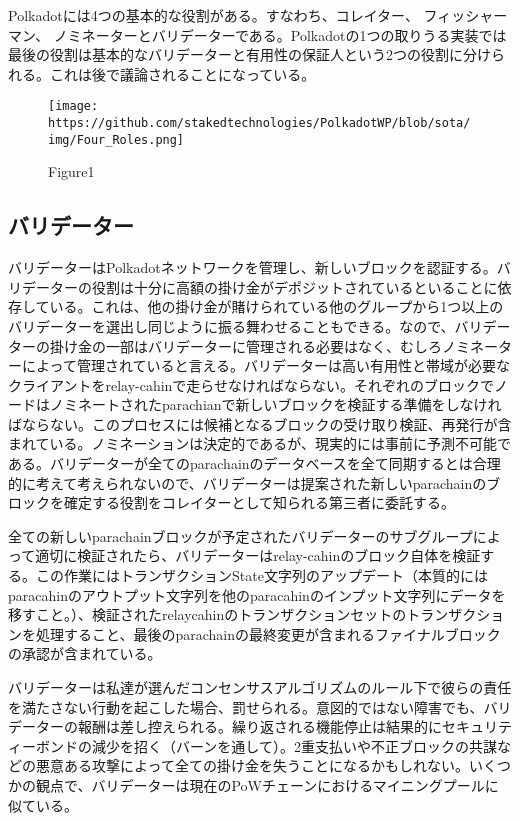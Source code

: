 Polkadotには4つの基本的な役割がある。すなわち、コレイター、
フィッシャーマン、
ノミネーターとバリデーターである。Polkadotの1つの取りうる実装では最後の役割は基本的なバリデーターと有用性の保証人という2つの役割に分けられる。これは後で議論されることになっている。

\begin{figure}
\centering
\texttt{[image: https://github.com/stakedtechnologies/PolkadotWP/blob/sota/img/Four\_Roles.png]}
\caption{Figure1}
\end{figure}

\hypertarget{ux30d0ux30eaux30c7ux30fcux30bfux30fc}{%
\subsection{バリデーター}\label{ux30d0ux30eaux30c7ux30fcux30bfux30fc}}

バリデーターはPolkadotネットワークを管理し、新しいブロックを認証する。バリデーターの役割は十分に高額の掛け金がデポジットされているといることに依存している。これは、他の掛け金が賭けられている他のグループから1つ以上のバリデーターを選出し同じように振る舞わせることもできる。なので、バリデーターの掛け金の一部はバリデーターに管理される必要はなく、むしろノミネーターによって管理されていると言える。バリデーターは高い有用性と帯域が必要なクライアントをrelay-cahinで走らせなければならない。それぞれのブロックでノードはノミネートされたparachianで新しいブロックを検証する準備をしなければならない。このプロセスには候補となるブロックの受け取り検証、再発行が含まれている。ノミネーションは決定的であるが、現実的には事前に予測不可能である。バリデーターが全てのparachainのデータベースを全て同期するとは合理的に考えて考えられないので、バリデーターは提案された新しいparachainのブロックを確定する役割をコレイターとして知られる第三者に委託する。

全ての新しいparachainブロックが予定されたバリデーターのサブグループによって適切に検証されたら、バリデーターはrelay-cahinのブロック自体を検証する。この作業にはトランザクションState文字列のアップデート（本質的にはparacahinのアウトプット文字列を他のparacahinのインプット文字列にデータを移すこと。）、検証されたrelaycahinのトランザクションセットのトランザクションを処理すること、最後のparachainの最終変更が含まれるファイナルブロックの承認が含まれている。

バリデーターは私達が選んだコンセンサスアルゴリズムのルール下で彼らの責任を満たさない行動を起こした場合、罰せられる。意図的ではない障害でも、バリデーターの報酬は差し控えられる。繰り返される機能停止は結果的にセキュリティーボンドの減少を招く（バーンを通して）。2重支払いや不正ブロックの共謀などの悪意ある攻撃によって全ての掛け金を失うことになるかもしれない。いくつかの観点で、バリデーターは現在のPoWチェーンにおけるマイニングプールに似ている。

